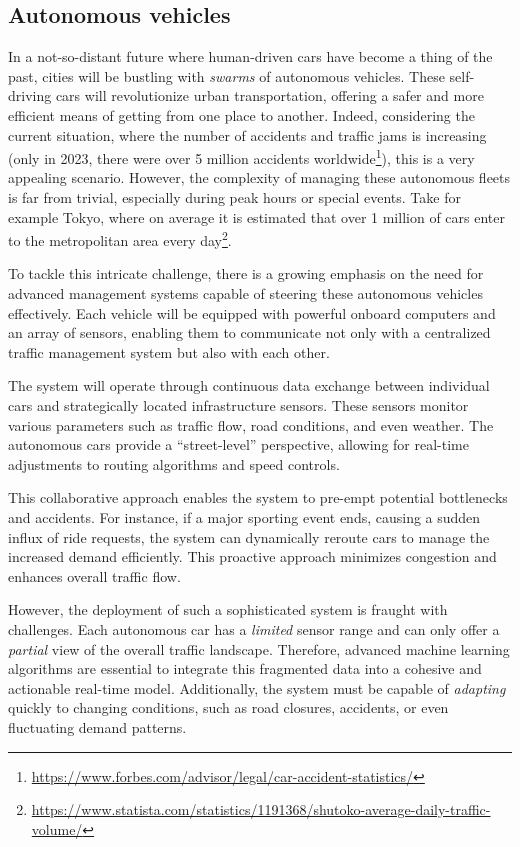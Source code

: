\subsection{Autonomous vehicles}
In a not-so-distant future
 where human-driven cars have become a thing of the past, 
 cities will be bustling with \emph{swarms} of autonomous vehicles. 
% 
These self-driving cars will revolutionize urban transportation, 
 offering a safer and more efficient means of getting from one place to another. 
Indeed, considering the current situation, 
 where the number of accidents and traffic jams is increasing (only in 2023, there were over 5 million accidents worldwide\footnote{\url{https://www.forbes.com/advisor/legal/car-accident-statistics/}}), 
 this is a very appealing scenario.
However, the complexity of managing these autonomous fleets is far from trivial, 
 especially during peak hours or special events. 
%
Take for example Tokyo,
 where on average it is estimated that
 over 1 million of cars enter to the metropolitan area every day\footnote{\url{https://www.statista.com/statistics/1191368/shutoko-average-daily-traffic-volume/}}.

To tackle this intricate challenge, 
 there is a growing emphasis on the need for advanced management systems capable 
 of steering these autonomous vehicles effectively. 
 Each vehicle will be equipped with powerful onboard computers 
 and an array of sensors, 
 enabling them to communicate not only with a centralized traffic management system 
 but also with each other.

The system will operate through continuous data 
 exchange between individual cars 
 and strategically located infrastructure sensors. 
 These sensors monitor various parameters such as traffic flow, 
 road conditions, and even weather. 
 The autonomous cars provide a ``street-level'' perspective, 
 allowing for real-time adjustments to routing algorithms 
 and speed controls.

This collaborative approach enables the system to pre-empt potential bottlenecks and accidents. 
 For instance, if a major sporting event ends, 
 causing a sudden influx of ride requests, 
 the system can dynamically reroute cars to manage the increased demand efficiently. 
 This proactive approach minimizes congestion and enhances overall traffic flow.

However, the deployment of such a sophisticated system is fraught with challenges. 
 Each autonomous car has a \emph{limited} sensor range and can only offer a \emph{partial} view of the overall traffic landscape. 
 Therefore, advanced machine learning algorithms are essential to integrate this fragmented data into a cohesive and actionable real-time model. 
 Additionally, the system must be capable of \emph{adapting} quickly to changing conditions, such as road closures, accidents, or even fluctuating demand patterns.

